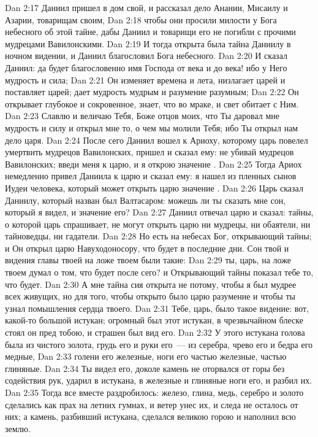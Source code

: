 \vs Dan 2:17 Даниил пришел в дом свой, и рассказал дело Анании, Мисаилу и Азарии, товарищам своим,
\vs Dan 2:18 чтобы они просили милости у Бога небесного об этой тайне, дабы Даниил и товарищи его не погибли с прочими мудрецами Вавилонскими.
\vs Dan 2:19 И тогда открыта была тайна Даниилу в ночном видении, и Даниил благословил Бога небесного.
\vs Dan 2:20 И сказал Даниил: да будет благословенно имя Господа от века и до века! ибо у Него мудрость и сила;
\vs Dan 2:21 Он изменяет времена и лета, низлагает царей и поставляет царей; дает мудрость мудрым и разумение разумным;
\vs Dan 2:22 Он открывает глубокое и сокровенное, знает, что во мраке, и свет обитает с Ним.
\vs Dan 2:23 Славлю и величаю Тебя, Боже отцов моих, что Ты даровал мне мудрость и силу и открыл мне то, о чем мы молили Тебя; ибо Ты открыл нам дело царя.
\vs Dan 2:24 После сего Даниил вошел к Ариоху, которому царь повелел умертвить мудрецов Вавилонских, пришел и сказал ему: не убивай мудрецов Вавилонских; введи меня к царю, и я открою значение .
\vs Dan 2:25 Тогда Ариох немедленно привел Даниила к царю и сказал ему: я нашел из пленных сынов Иудеи человека, который может открыть царю значение .
\vs Dan 2:26 Царь сказал Даниилу, который назван был Валтасаром: можешь ли ты сказать мне сон, который я видел, и значение его?
\rsbpar\vs Dan 2:27 Даниил отвечал царю и сказал: тайны, о которой царь спрашивает, не могут открыть царю ни мудрецы, ни обаятели, ни тайноведцы, ни гадатели.
\vs Dan 2:28 Но есть на небесах Бог, открывающий тайны; и Он открыл царю Навуходоносору, что будет в последние дни. Сон твой и видения главы твоей на ложе твоем были такие:
\vs Dan 2:29 ты, царь, на ложе твоем думал о том, что будет после сего? и Открывающий тайны показал тебе то, что будет.
\vs Dan 2:30 А мне тайна сия открыта не потому, чтобы я был мудрее всех живущих, но для того, чтобы открыто было царю разумение и чтобы ты узнал помышления сердца твоего.
\vs Dan 2:31 Тебе, царь, было такое видение: вот, какой-то большой истукан; огромный был этот истукан, в чрезвычайном блеске стоял он пред тобою, и страшен был вид его.
\vs Dan 2:32 У этого истукана голова была из чистого золота, грудь его и руки его~--- из серебра, чрево его и бедра его медные,
\vs Dan 2:33 голени его железные, ноги его частью железные, частью глиняные.
\vs Dan 2:34 Ты видел его, доколе камень не оторвался от горы без содействия рук, ударил в истукана, в железные и глиняные ноги его, и разбил их.
\vs Dan 2:35 Тогда все вместе раздробилось: железо, глина, медь, серебро и золото сделались как прах на летних гумнах, и ветер унес их, и следа не осталось от них; а камень, разбивший истукана, сделался великою горою и наполнил всю землю.
